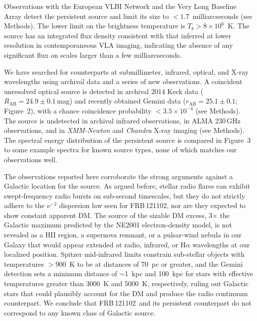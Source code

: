 \documentclass{nature_frb}
\newcommand{\frb}{FRB\,121102}
\begin{document}
Observations with the European VLBI Network and the Very Long Baseline Array detect the persistent source and limit its size to $<1.7$~milliarcseconds (see Methods). The lower limit on the brightness temperature is $T_b > 8 \times 10^{6}$~K. The source has an integrated flux density consistent with that inferred at lower resolution in contemporaneous VLA imaging, indicating the absence of any significant flux on scales larger than a few milliarcseconds.

We have searched for counterparts at submillimeter, infrared, optical, and X-ray wavelengths using archival data and a series of new observations. A coincident unresolved optical source is detected in archival 2014 Keck data ($R_\mathrm{AB}=24.9\pm0.1$\,mag) and recently obtained Gemini data ($r_\mathrm{AB}=25.1\pm0.1$; Figure~2), with a chance coincidence probability $< 3.5\times10^{-4}$ (see Methods).
The source is undetected in archival infrared observations, in ALMA 230\,GHz observations, and in {\it XMM-Newton} and {\it Chandra} X-ray imaging (see Methods). The spectral energy distribution of the persistent source is compared in Figure~3 to some example spectra for known source types, none of which matches our observations well.

The observations reported here corroborate the strong arguments\cite{ssh+16b} against a Galactic location for the source.
As argued before, stellar radio flares can exhibit swept-frequency radio bursts on sub-second timescales\cite{mls+15a}, but they do not strictly adhere to the $\nu^{-2}$ dispersion law seen for \frb\cite{ssh+16a,ssh+16b}, nor are they expected to show constant apparent DM.
The source of the sizable DM excess, 3$\times$ the Galactic maximum
predicted by the NE2001 electron-density model\cite{cl02}, is not revealed as a HII region, a supernova remnant, or a pulsar-wind nebula in our Galaxy that would appear extended at radio, infrared, or H$\alpha$\cite{ssh+16b} wavelengths at our localized position.
Spitzer mid-infrared limits constrain sub-stellar objects with temperatures $>900$~K to be at distances of 70~pc or greater, and the Gemini detection sets a minimum distance of $\sim$1~kpc and 100~kpc for stars with effective temperatures greater than 3000~K and 5000~K, respectively, ruling out Galactic stars that could plausibly account for the DM and produce the radio continuum counterpart.
We conclude that \frb\ and its persistent counterpart do not correspond to any known class of Galactic source.
\end{document}
